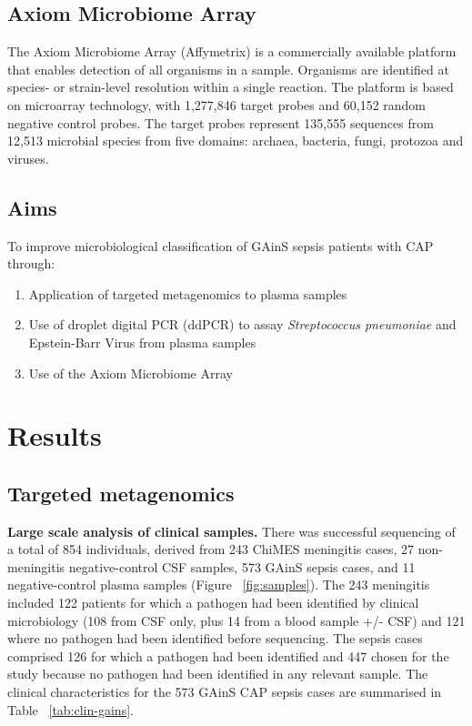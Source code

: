 \subsection{Axiom Microbiome Array}
The Axiom Microbiome Array (Affymetrix) is a commercially available platform that enables detection of all organisms in a sample. Organisms are identified at species- or strain-level resolution within a single reaction. The platform is based on microarray technology, with 1,277,846 target probes and 60,152 random negative control probes. The target probes represent 135,555 sequences from 12,513 microbial species from five domains: archaea, bacteria, fungi, protozoa and viruses. 

\subsection{Aims}

To improve microbiological classification of GAinS sepsis patients with CAP through:
\begin{enumerate}
	\item Application of targeted metagenomics to plasma samples
	\item Use of droplet digital PCR (ddPCR) to assay \textit{Streptococcus pneumoniae} and Epstein-Barr Virus from plasma samples
	\item Use of the Axiom Microbiome Array
\end{enumerate}

\section{Results}

\subsection{Targeted metagenomics}
\textbf{Large scale analysis of clinical samples.}
There was successful sequencing of a total of 854 individuals, derived from 243 ChiMES meningitis cases, 27 non-meningitis negative-control CSF samples, 573 GAinS sepsis cases, and 11 negative-control plasma samples (Figure ~\ref{fig:samples}). The 243 meningitis included 122 patients for which a pathogen had been identified by clinical microbiology (108 from CSF only, plus 14 from a blood sample +/- CSF) and 121 where no pathogen had been identified before sequencing. The sepsis cases comprised 126 for which a pathogen had been identified and 447 chosen for the study because no pathogen had been identified in any relevant sample. The clinical characteristics for the 573 GAinS CAP sepsis cases are summarised in Table ~\ref{tab:clin-gains}.

